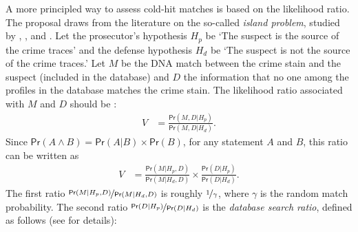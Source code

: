 \documentclass{article}
\newcommand{\pr}{\mathsf{Pr}}
\begin{document}
A more principled way to assess cold-hit matches is based on the likelihood ratio.  The proposal  draws from the literature on  the so-called \emph{island problem}, studied by \citet{eggleston1978evidence},  \citet{dawid1994island}, and \citet{dawid1996CoherentAnalysisForensic}.
Let the prosecutor's hypothesis $H_p$ be `The suspect is the source of the crime traces' and the defense hypothesis $H_d$ be `The suspect is not the source of the crime traces.'  Let $M$ be the DNA  match between the crime stain and the suspect (included in the database) and $D$ the information that no one among the %
profiles in the database matches the crime stain.  The likelihood ratio associated with $M$ and $D$ should be \citep{balding1996EvaluatingDNAProfilea, taroni2006bayesian}:
%
\begin{align*}
V & = \frac{\pr(M,D\vert H_p)}{\pr(M,D\vert H_d)}.
\end{align*}
%
Since $\pr(A\wedge B)=\pr(A\vert B)\times \pr(B)$, for any statement $A$ and $B$, this ratio can be written as
%
\begin{align*}
V & = \frac{\pr(M\vert H_p,D)}{\pr(M\vert H_d,D)} \times \frac{\pr(D\vert H_p)}{\pr(D\vert H_d)}.
\end{align*}
%
The first ratio $\nicefrac{\pr(M\vert H_p,D)}{\pr(M\vert H_d,D)}$ is roughly $\nicefrac{1}{\gamma}$, where $\gamma$ is the random match probability. The second ratio $\nicefrac{\pr(D\vert H_p)}{\pr(D\vert H_d)}$ is the \emph{database search ratio}, defined as follows (see \cite{balding1996EvaluatingDNAProfilea, taroni2006bayesian} for details):
%
%
%
\end{document}
